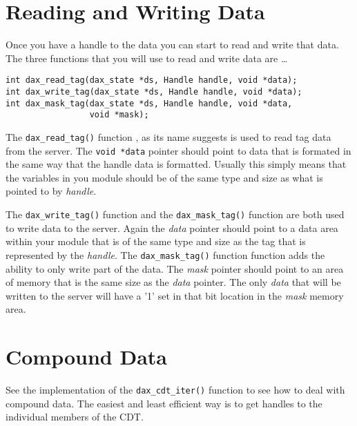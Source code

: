 \section{Reading and Writing Data}

Once you have a handle to the data you can start to read and write that data.  The three functions that you will use to read and write data are \ldots

\begin{verbatim}
int dax_read_tag(dax_state *ds, Handle handle, void *data);
int dax_write_tag(dax_state *ds, Handle handle, void *data);
int dax_mask_tag(dax_state *ds, Handle handle, void *data,
                 void *mask);
\end{verbatim}

The \verb|dax_read_tag()| function , as its name suggests is used to read tag data from the server.  The \verb|void *data| pointer should point to data that is formated in the same way that the handle data is formatted.  Usually this simply means that the variables in you module should be of the same type and size as what is pointed to by \emph{handle}.

The \verb|dax_write_tag()| function  and the \verb|dax_mask_tag()| function  are both used to write data to the server.  Again the \emph{data} pointer should point to a data area within your module that is of the same type and size as the tag that is represented by the \emph{handle}.  The \verb|dax_mask_tag()| function function adds the ability to only write part of the data.  The \emph{mask} pointer should point to an area of memory that is the same size as the \emph{data} pointer.  The only \emph{data} that will be written to the server will have a '1' set in that bit location in the \emph{mask} memory area.

\section{Compound Data}

See the implementation of the \verb|dax_cdt_iter()| function  to see how to deal with compound data.  The easiest and least efficient way is to get handles to the individual members of the CDT.

